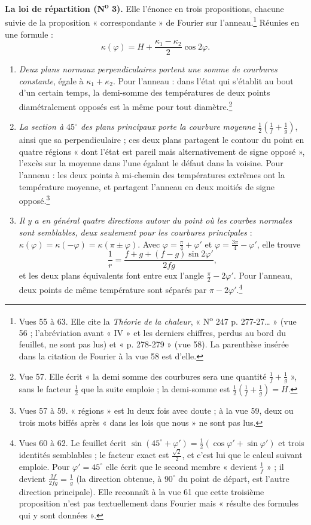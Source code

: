 \documentclass[11pt,a4paper]{article}
\begin{document}
\textbf{La loi de répartition (N\textsuperscript{o} 3).} Elle l'énonce en trois
propositions, chacune suivie de la proposition « correspondante » de Fourier sur
l'anneau.\footnote{Vues 55 à 63. Elle cite la \emph{Théorie de la chaleur},
« N\textsuperscript{o} 247 p. 277-27… » (vue 56 ; l'abréviation avant « IV » et les derniers
chiffres, perdus au bord du feuillet, ne sont pas lus) et « p. 278-279 »
(vue 58). La parenthèse insérée dans la citation de Fourier à la vue 58 est
d'elle.} Réunies en une formule :
\[
\kappa(\varphi) = H + \frac{\kappa_1-\kappa_2}{2}\cos 2\varphi .
\]

\begin{enumerate}
\item \emph{Deux plans normaux perpendiculaires portent une somme de courbures
constante}, égale à $\kappa_1 + \kappa_2$. Pour l'anneau : dans l'état qui
s'établit au bout d'un certain temps, la demi-somme des températures de deux
points diamétralement opposés est la même pour tout diamètre.\footnote{Vue 57.
Elle écrit « la demi somme des courbures sera une quantité $\frac1f +
\frac1g$ », sans le facteur $\frac12$ que la suite emploie ; la demi-somme est
$\frac12(\frac1f + \frac1g) = H$.}
\item \emph{La section à $45^\circ$ des plans principaux porte la courbure
moyenne} $\frac12(\frac1f + \frac1g)$, ainsi que sa perpendiculaire ; ces deux
plans partagent le contour du point en quatre régions « dont l'état est pareil
mais alternativement de signe opposé », l'excès sur la moyenne dans l'une égalant
le défaut dans la voisine. Pour l'anneau : les deux points à mi-chemin des
températures extrêmes ont la température moyenne, et partagent l'anneau en deux
moitiés de signe opposé.\footnote{Vues 57 à 59. « régions » est lu deux fois
avec doute ; à la vue 59, deux ou trois mots biffés après « dans les lois que
nous » ne sont pas lus.}
\item \emph{Il y a en général quatre directions autour du point où les courbes
normales sont semblables, deux seulement pour les courbures principales} :
$\kappa(\varphi) = \kappa(-\varphi) = \kappa(\pi \pm \varphi)$. Avec $\varphi =
\frac\pi4 + \varphi'$ et $\varphi = \frac{3\pi}{4} - \varphi'$, elle trouve
\[
\frac1r = \frac{f + g + (f-g)\sin 2\varphi'}{2fg},
\]
et les deux plans équivalents font entre eux l'angle $\frac\pi2 - 2\varphi'$.
Pour l'anneau, deux points de même température sont séparés par $\pi -
2\varphi'$.\footnote{Vues 60 à 62. Le feuillet écrit $\sin(45^\circ + \varphi') =
\frac12(\cos\varphi' + \sin\varphi')$ et trois identités semblables ; le facteur
exact est $\frac{\sqrt2}{2}$, et c'est lui que le calcul suivant emploie. Pour
$\varphi' = 45^\circ$ elle écrit que le second membre « devient $\frac1f$ » ; il
devient $\frac{2f}{2fg} = \frac1g$ (la direction obtenue, à $90^\circ$ du point
de départ, est l'autre direction principale). Elle reconnaît à la vue 61 que
cette troisième proposition n'est pas textuellement dans Fourier mais « résulte
des formules qui y sont données ».}
\end{enumerate}
\end{document}
